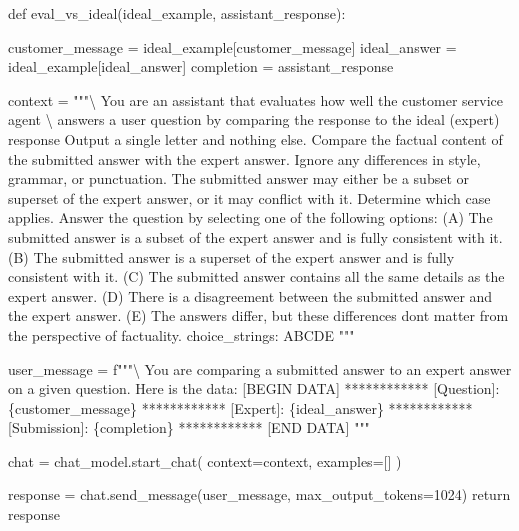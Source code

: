 \documentclass[
  letterpaper,
  DIV=11,
  numbers=noendperiod]{scrreprt}
\newenvironment{Shaded}{\begin{snugshade}}{\end{snugshade}}
\newcommand{\CharTok}[1]{\textcolor[rgb]{0.13,0.47,0.30}{#1}}
\newcommand{\ControlFlowTok}[1]{\textcolor[rgb]{0.00,0.23,0.31}{#1}}
\newcommand{\DecValTok}[1]{\textcolor[rgb]{0.68,0.00,0.00}{#1}}
\newcommand{\KeywordTok}[1]{\textcolor[rgb]{0.00,0.23,0.31}{#1}}
\newcommand{\NormalTok}[1]{\textcolor[rgb]{0.00,0.23,0.31}{#1}}
\newcommand{\OperatorTok}[1]{\textcolor[rgb]{0.37,0.37,0.37}{#1}}
\newcommand{\SpecialCharTok}[1]{\textcolor[rgb]{0.37,0.37,0.37}{#1}}
\newcommand{\SpecialStringTok}[1]{\textcolor[rgb]{0.13,0.47,0.30}{#1}}
\newcommand{\StringTok}[1]{\textcolor[rgb]{0.13,0.47,0.30}{#1}}
\begin{document}
\begin{Shaded}
\begin{Highlighting}[]
\KeywordTok{def}\NormalTok{ eval\_vs\_ideal(ideal\_example, assistant\_response):}

\NormalTok{    customer\_message }\OperatorTok{=}\NormalTok{ ideal\_example[}\StringTok{\textquotesingle{}customer\_message\textquotesingle{}}\NormalTok{]}
\NormalTok{    ideal\_answer }\OperatorTok{=}\NormalTok{ ideal\_example[}\StringTok{\textquotesingle{}ideal\_answer\textquotesingle{}}\NormalTok{]}
\NormalTok{    completion }\OperatorTok{=}\NormalTok{ assistant\_response}

\NormalTok{    context }\OperatorTok{=} \StringTok{"""}\CharTok{\textbackslash{}}
\StringTok{    You are an assistant that evaluates how well the customer service agent }\CharTok{\textbackslash{}}
\StringTok{    answers a user question by comparing the response to the ideal (expert) response}
\StringTok{    Output a single letter and nothing else.}
\StringTok{    Compare the factual content of the submitted answer with the expert answer. Ignore any differences in style, grammar, or punctuation.}
\StringTok{    The submitted answer may either be a subset or superset of the expert answer, or it may conflict with it. Determine which case applies. Answer the question by selecting one of the following options:}
\StringTok{    (A) The submitted answer is a subset of the expert answer and is fully consistent with it.}
\StringTok{    (B) The submitted answer is a superset of the expert answer and is fully consistent with it.}
\StringTok{    (C) The submitted answer contains all the same details as the expert answer.}
\StringTok{    (D) There is a disagreement between the submitted answer and the expert answer.}
\StringTok{    (E) The answers differ, but these differences don\textquotesingle{}t matter from the perspective of factuality.}
\StringTok{  choice\_strings: ABCDE}
\StringTok{    """}

\NormalTok{    user\_message }\OperatorTok{=} \SpecialStringTok{f"""}\CharTok{\textbackslash{}}
\SpecialStringTok{You are comparing a submitted answer to an expert answer on a given question. Here is the data:}
\SpecialStringTok{    [BEGIN DATA]}
\SpecialStringTok{    ************}
\SpecialStringTok{    [Question]: }\SpecialCharTok{\{}\NormalTok{customer\_message}\SpecialCharTok{\}}
\SpecialStringTok{    ************}
\SpecialStringTok{    [Expert]: }\SpecialCharTok{\{}\NormalTok{ideal\_answer}\SpecialCharTok{\}}
\SpecialStringTok{    ************}
\SpecialStringTok{    [Submission]: }\SpecialCharTok{\{}\NormalTok{completion}\SpecialCharTok{\}}
\SpecialStringTok{    ************}
\SpecialStringTok{    [END DATA]}
\SpecialStringTok{"""}

\NormalTok{    chat }\OperatorTok{=}\NormalTok{ chat\_model.start\_chat(}
\NormalTok{    context}\OperatorTok{=}\NormalTok{context,}
\NormalTok{    examples}\OperatorTok{=}\NormalTok{[]}
\NormalTok{    )}

\NormalTok{    response }\OperatorTok{=}\NormalTok{ chat.send\_message(user\_message, max\_output\_tokens}\OperatorTok{=}\DecValTok{1024}\NormalTok{)}
    \ControlFlowTok{return}\NormalTok{ response}
\end{Highlighting}
\end{Shaded}
\end{document}
